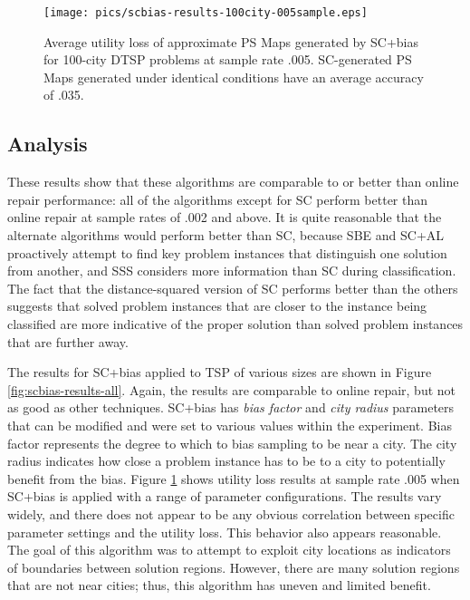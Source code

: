 \begin{figure}
\begin{center}
\texttt{[image: pics/scbias-results-100city-005sample.eps]}
\caption{Average utility loss of approximate PS Maps generated by SC+bias for 100-city DTSP problems at sample rate .005.  SC-generated PS Maps generated under identical conditions have an average accuracy of .035.}
\label{fig:scbias-results-100city-005sample}
\end{center}
\end{figure}


\subsection{Analysis}

These results show that these algorithms are comparable to or better than online repair performance:  all of the algorithms except for SC perform better than online repair at sample rates of .002 and above.  It is quite reasonable that the alternate algorithms would perform better than SC, because SBE and SC+AL proactively attempt to find key problem instances that distinguish one solution from another, and SSS considers more information than SC during classification.  The fact that the distance-squared version of SC performs better than the others suggests that solved problem instances that are closer to the instance being classified are more indicative of the proper solution than solved problem instances that are further away.

The results for SC+bias applied to TSP of various sizes are shown in Figure \ref{fig:scbias-results-all}.  Again, the results are comparable to online repair, but not as good as other techniques.  SC+bias has \textit{bias factor} and \textit{city radius} parameters that can be modified and were set to various values within the experiment.  Bias factor represents the degree to which to bias sampling to be near a city.  The city radius indicates how close a problem instance has to be to a city to potentially benefit from the bias.  Figure \ref{fig:scbias-results-100city-005sample} shows utility loss results at sample rate .005 when SC+bias is applied with a range of parameter configurations.  The results vary widely, and there does not appear to be any obvious correlation between specific parameter settings and the utility loss.  This behavior also appears reasonable.  The goal of this algorithm was to attempt to exploit city locations as indicators of boundaries between solution regions.  However, there are many solution regions that are not near cities; thus, this algorithm has uneven and limited benefit.

